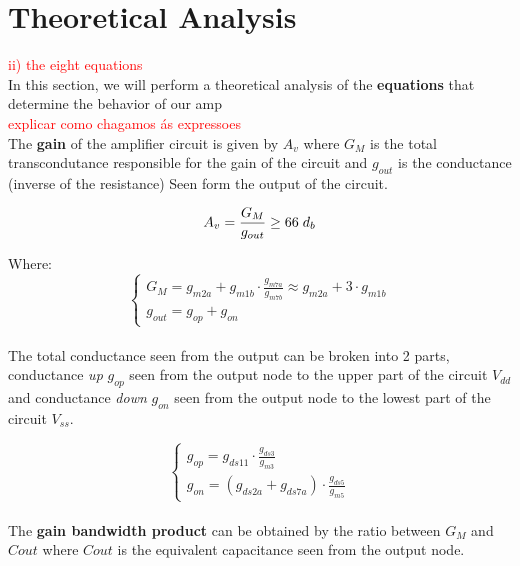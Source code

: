 \section{Theoretical Analysis}

\textcolor{red}{ii) the eight equations}\\

In this section, we will perform a theoretical analysis of the \textbf{equations} that determine the behavior of our amp\\

\textcolor{red}{explicar como chagamos ás expressoes}\\

The \textbf{gain} of the amplifier circuit is given by $A_v$ where $G_M$ is the total transcondutance responsible for the gain of the circuit and $g_{out}$ is the conductance (inverse of the resistance) Seen form the output of the circuit.

$$A_v =  \frac{G_M}{g_{out}} \geq 66\hspace{0.1cm}d_b\\[0.125cm]$$

Where:
\begin{equation}
    \begin{cases}
        G_M = g_{m2a} + g_{m1b} \cdot \frac{g_{m7a}}{g_{m7b}} \approx g_{m2a} + 3 \cdot g_{m1b} \\
        g_{out} = g_{op} + g_{on}
    \end{cases}
\end{equation}\\

The total conductance seen from the output can be broken into 2 parts, conductance \textit{up} $g_{op}$ seen from the output node to the upper part of the circuit $V_{dd}$ and conductance \textit{down} $g_{on}$ seen from the output node to the lowest part of the circuit $V_{ss}$.

\begin{equation}
    \begin{cases}
        g_{op} = g_{ds11} \cdot \frac{g_{ds3}}{g_{m3}} \\
        g_{on} = \left( g_{ds2a} + g_{ds7a} \right) \cdot \frac{g_{ds5}}{g_{m5}}
    \end{cases}
\end{equation}\\

The \textbf{gain bandwidth product} can be obtained by the ratio between $G_M$ and $C{out}$ where $C{out}$ is the equivalent capacitance seen from the output node.

